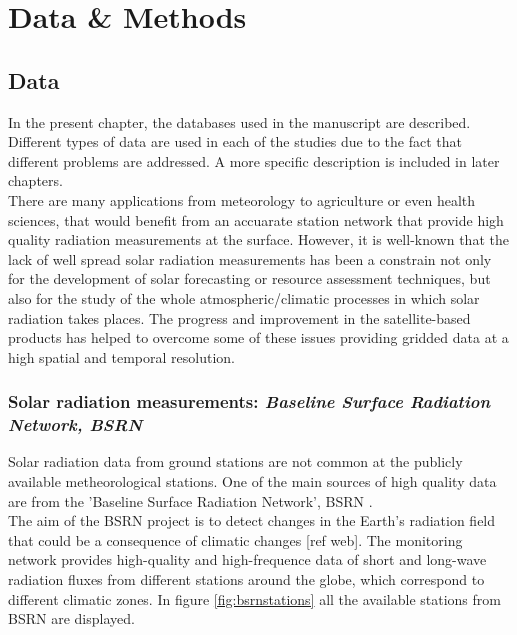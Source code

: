 \part{Data \& Methods\label{cha:datamethods}}

  
\chapter{Data\label{cha:Data}}

  In the present chapter, the databases used in the manuscript are described. Different types of data are used in each of the studies due to the fact that different problems are addressed. A more specific description is included in later chapters.\\

  There are many applications from meteorology to agriculture or even health sciences, that would benefit from an accuarate station network that provide high quality radiation measurements at the surface. However, it is well-known that the lack of  well spread solar radiation measurements has been a constrain not only for the development of solar forecasting or resource assessment techniques, but also for the study of the whole atmospheric/climatic processes in which solar radiation takes places. The progress and improvement in the satellite-based products has helped to overcome some of these issues providing gridded data at a high spatial and temporal resolution.\\

  \section{Solar radiation measurements: \textit{Baseline Surface Radiation Network, BSRN}}

  Solar radiation data from ground stations are not common at the publicly available metheorological stations. One of the main sources of high quality data are from the 'Baseline Surface Radiation Network', BSRN \cite*{Konig-Langlo2013}.\\ %

  The aim of the BSRN project is to detect changes in the Earth's radiation field that could be a consequence of climatic changes [ref web]. The monitoring network provides high-quality and high-frequence data of short and long-wave radiation fluxes from different stations around the globe, which correspond to different climatic zones. In figure \ref{fig:bsrnstations} all the available stations from BSRN are displayed.\\

